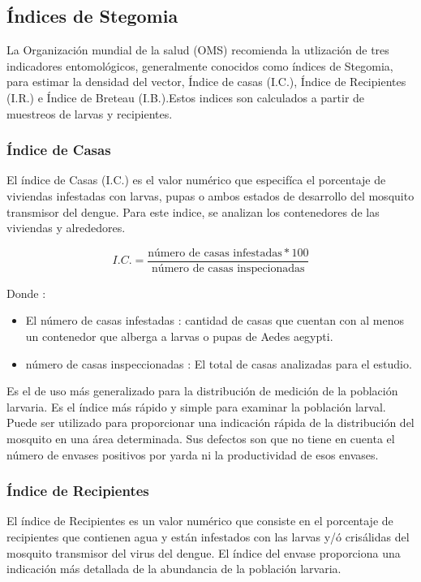 \subsection{Índices de Stegomia}
\label{sec:densidad-vectorial-indices-stegomia}

La Organización mundial de la salud (OMS) recomienda la utlización de tres
indicadores entomológicos, generalmente conocidos como índices de Stegomia,
para estimar la densidad del vector, Índice de casas (I.C.), Índice de
Recipientes (I.R.) e Índice de Breteau (I.B.).Estos indices son calculados a
partir de muestreos de larvas y recipientes.

\subsubsection{Índice de Casas}
El índice de Casas (I.C.) es el valor numérico que especifíca el porcentaje
de viviendas infestadas con larvas, pupas o ambos estados de desarrollo
del mosquito transmisor del dengue. Para este indice, se analizan los
contenedores de las viviendas y alrededores.

\begin{equation}
I.C. = \frac{\text{número de casas infestadas} * 100}{\text{número de casas inspecionadas}}
\end{equation}

Donde :
\begin{itemize}
\item El número de casas infestadas : cantidad de casas que
cuentan con al menos un contenedor que alberga a larvas o pupas de Aedes
aegypti.
\item número de casas inspeccionadas : El total de casas analizadas para
el estudio.
\end{itemize}

Es el de uso más generalizado para la distribución de medición de
la población larvaria. Es el índice más rápido y simple para examinar la
población larval. Puede ser utilizado para proporcionar una indicación
rápida de la distribución del mosquito en una área determinada. Sus
defectos son que no tiene en cuenta el número de envases positivos por
yarda ni la productividad de esos envases.

\subsubsection{Índice de Recipientes}
El índice de Recipientes es un valor numérico que consiste en el
porcentaje de recipientes que contienen agua y están infestados con las
larvas y/ó crisálidas del mosquito transmisor del virus del dengue.
El índice del envase proporciona una indicación más detallada de la
abundancia de la población larvaria.


